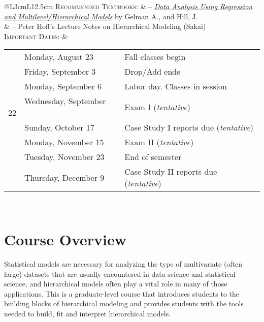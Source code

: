 \documentclass[11pt, a4paper]{article}
\newcommand{\tabitem}{~~\llap{\textbullet}~~}
\begin{document}
\begin{center}
\begin{minipage}[t]{.95\textwidth}
\begin{tabular}{@{}L{3cm}L{12.5cm}}
			\textsc{Recommended Textbooks:} & -- \href{https://www.amazon.com/gp/product/052168689X/ref=as_li_qf_sp_asin_il_tl?ie=UTF8&camp=1789&creative=9325&creativeASIN=052168689X&linkCode=as2&tag=andrsblog0f-20&linkId=PX5B5V6ZPCT2UIYV}{\textit{Data Analysis Using Regression and Multilevel/Hierarchical Models}} by Gelman A., and Hill, J.  \\
			& -- Peter Hoff's Lecture Notes on Hierarchical Modeling (Sakai) \\
			\textsc{Important Dates:} & \begin{minipage}[t]{.95\textwidth}
				\begin{tabular}{@{}ll}
					\tabitem Monday, August 23	& Fall classes begin \\
					\tabitem Friday, September 3	& Drop/Add ends \\
					\tabitem Monday, September 6 & Labor day. Classes in session \\
					\tabitem Wednesday, September 22 & Exam I (\textit{tentative})\\
					\tabitem Sunday, October 17 & Case Study I reports due (\textit{tentative})\\
					\tabitem Monday, November 15 & Exam II (\textit{tentative})\\
					\tabitem Tuesday, November 23 &	End of semester \\
					\tabitem Thursday, December 9 &	Case Study II reports due (\textit{tentative})\\
				\end{tabular}
			\end{minipage} \\
			\bottomrule[0.065cm]
		\end{tabular}
	\end{minipage}
\end{center}



\vspace{.5cm}
\setlength{\unitlength}{1in}
\renewcommand{\arraystretch}{1.5}



\section{Course Overview}
Statistical models are necessary for analyzing the type of multivariate (often large) datasets that are usually encountered in data science and statistical science, and hierarchical models often play a vital role in many of those applications. This is a graduate-level course that introduces students to the building blocks of hierarchical modeling and provides students with the tools needed to build, fit and interpret hierarchical models.
\end{document}
